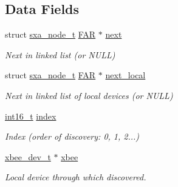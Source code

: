 \subsection*{Data Fields}
\begin{DoxyCompactItemize}
\item 
\mbox{\label{structsxa__node__t_a10a0382c260b61c11040f1ea8853abd5}} 
struct \hyperlink{structsxa__node__t}{sxa\+\_\+node\+\_\+t} \hyperlink{group__hal_gaef060b3456fdcc093a7210a762d5f2ed}{F\+AR} $\ast$ \hyperlink{structsxa__node__t_a10a0382c260b61c11040f1ea8853abd5}{next}
\begin{DoxyCompactList}\small\item\em Next in linked list (or N\+U\+LL) \end{DoxyCompactList}\item 
\mbox{\label{structsxa__node__t_aba67917f7787a4106c8c066621db9bea}} 
struct \hyperlink{structsxa__node__t}{sxa\+\_\+node\+\_\+t} \hyperlink{group__hal_gaef060b3456fdcc093a7210a762d5f2ed}{F\+AR} $\ast$ \hyperlink{structsxa__node__t_aba67917f7787a4106c8c066621db9bea}{next\+\_\+local}
\begin{DoxyCompactList}\small\item\em Next in linked list of local devices (or N\+U\+LL) \end{DoxyCompactList}\item 
\mbox{\label{structsxa__node__t_a8411ba20cacdddb520e6c1358291c9ba}} 
\hyperlink{group__hal__dos_ga2140805d08462d474b82ddc8d1c2f3e6}{int16\+\_\+t} \hyperlink{structsxa__node__t_a8411ba20cacdddb520e6c1358291c9ba}{index}
\begin{DoxyCompactList}\small\item\em Index (order of discovery\+: 0, 1, 2...) \end{DoxyCompactList}\item 
\mbox{\label{structsxa__node__t_a79f0c368a2efd172b3779a2ef3a26706}} 
\hyperlink{structxbee__dev__t}{xbee\+\_\+dev\+\_\+t} $\ast$ \hyperlink{structsxa__node__t_a79f0c368a2efd172b3779a2ef3a26706}{xbee}
\begin{DoxyCompactList}\small\item\em Local device through which discovered. \end{DoxyCompactList}\item 

\end{DoxyCompactItemize}
